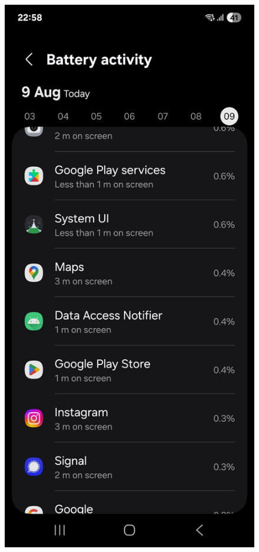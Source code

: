 \begin{figure}[H]
\begin{minipage}{0.32\textwidth}
\end{minipage}%
\hfill
\begin{minipage}{0.32\textwidth}
    \centering
    \includegraphics[width=\textwidth]{english/figures/IMG_20250809_225839_290.jpg}

\end{minipage}
\end{figure}
